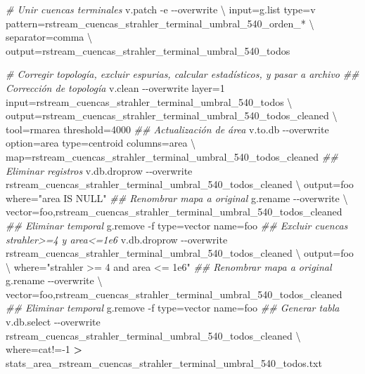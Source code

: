 \documentclass[spanish]{article}
\newenvironment{Shaded}{\begin{snugshade}}{\end{snugshade}}
\newcommand{\AttributeTok}[1]{\textcolor[rgb]{0.77,0.63,0.00}{#1}}
\newcommand{\CommentTok}[1]{\textcolor[rgb]{0.56,0.35,0.01}{\textit{#1}}}
\newcommand{\DataTypeTok}[1]{\textcolor[rgb]{0.13,0.29,0.53}{#1}}
\newcommand{\ExtensionTok}[1]{#1}
\newcommand{\KeywordTok}[1]{\textcolor[rgb]{0.13,0.29,0.53}{\textbf{#1}}}
\newcommand{\NormalTok}[1]{#1}
\newcommand{\OperatorTok}[1]{\textcolor[rgb]{0.81,0.36,0.00}{\textbf{#1}}}
\newcommand{\StringTok}[1]{\textcolor[rgb]{0.31,0.60,0.02}{#1}}
\begin{document}
\begin{Shaded}
\begin{Highlighting}[]
\CommentTok{\# Unir cuencas terminales}
\ExtensionTok{v.patch} \AttributeTok{{-}e} \AttributeTok{{-}{-}overwrite} \DataTypeTok{\textbackslash{}}
\NormalTok{  input=}\KeywordTok{\textasciigrave{}}\ExtensionTok{g.list}\NormalTok{ type=v pattern=}\StringTok{\textquotesingle{}rstream\_cuencas\_strahler\_terminal\_umbral\_540\_orden\_*\textquotesingle{}} \DataTypeTok{\textbackslash{}}
\NormalTok{    separator=comma}\KeywordTok{\textasciigrave{}} \DataTypeTok{\textbackslash{}}
\NormalTok{  output=rstream\_cuencas\_strahler\_terminal\_umbral\_540\_todos}


\CommentTok{\# Corregir topología, excluir espurias, calcular estadísticos, y pasar a archivo}
\CommentTok{\#\# Corrección de topología}
\ExtensionTok{v.clean} \AttributeTok{{-}{-}overwrite}\NormalTok{ layer=1 input=rstream\_cuencas\_strahler\_terminal\_umbral\_540\_todos }\DataTypeTok{\textbackslash{}}
\NormalTok{  output=rstream\_cuencas\_strahler\_terminal\_umbral\_540\_todos\_cleaned }\DataTypeTok{\textbackslash{}}
\NormalTok{  tool=rmarea threshold=4000}
\CommentTok{\#\# Actualización de área}
\ExtensionTok{v.to.db} \AttributeTok{{-}{-}overwrite}\NormalTok{ option=area type=centroid columns=area }\DataTypeTok{\textbackslash{}}
\NormalTok{  map=rstream\_cuencas\_strahler\_terminal\_umbral\_540\_todos\_cleaned}
\CommentTok{\#\# Eliminar registros}
\ExtensionTok{v.db.droprow} \AttributeTok{{-}{-}overwrite}\NormalTok{ rstream\_cuencas\_strahler\_terminal\_umbral\_540\_todos\_cleaned }\DataTypeTok{\textbackslash{}}
\NormalTok{  output=foo where=}\StringTok{"area IS NULL"}
\CommentTok{\#\# Renombrar mapa a original}
\ExtensionTok{g.rename} \AttributeTok{{-}{-}overwrite} \DataTypeTok{\textbackslash{}}
\NormalTok{  vector=foo,rstream\_cuencas\_strahler\_terminal\_umbral\_540\_todos\_cleaned}
\CommentTok{\#\# Eliminar temporal}
\ExtensionTok{g.remove} \AttributeTok{{-}f}\NormalTok{ type=vector name=foo}
\CommentTok{\#\# Excluir cuencas strahler\textgreater{}=4 y area\textless{}=1e6}
\ExtensionTok{v.db.droprow} \AttributeTok{{-}{-}overwrite}\NormalTok{ rstream\_cuencas\_strahler\_terminal\_umbral\_540\_todos\_cleaned }\DataTypeTok{\textbackslash{}}
\NormalTok{  output=foo }\DataTypeTok{\textbackslash{}}
\NormalTok{  where=}\StringTok{"strahler \textgreater{}= 4 and area \textless{}= 1e6"}
\CommentTok{\#\# Renombrar mapa a original}
\ExtensionTok{g.rename} \AttributeTok{{-}{-}overwrite} \DataTypeTok{\textbackslash{}}
\NormalTok{  vector=foo,rstream\_cuencas\_strahler\_terminal\_umbral\_540\_todos\_cleaned}
\CommentTok{\#\# Eliminar temporal}
\ExtensionTok{g.remove} \AttributeTok{{-}f}\NormalTok{ type=vector name=foo}
\CommentTok{\#\# Generar tabla}
\ExtensionTok{v.db.select} \AttributeTok{{-}{-}overwrite}\NormalTok{ rstream\_cuencas\_strahler\_terminal\_umbral\_540\_todos\_cleaned }\DataTypeTok{\textbackslash{}}
\NormalTok{  where=}\StringTok{\textquotesingle{}cat!={-}1\textquotesingle{}} \OperatorTok{\textgreater{}}\NormalTok{ stats\_area\_rstream\_cuencas\_strahler\_terminal\_umbral\_540\_todos.txt}



\end{Highlighting}
\end{Shaded}
\end{document}
